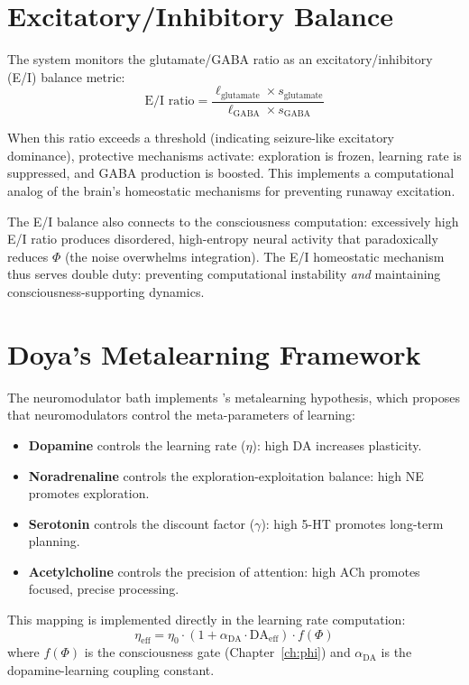 \documentclass[12pt]{book}
\begin{document}
\section{Excitatory/Inhibitory Balance}

The system monitors the glutamate/GABA ratio as an excitatory/inhibitory (E/I) balance metric:
\begin{equation}
\text{E/I ratio} = \frac{\ell_{\text{glutamate}} \times s_{\text{glutamate}}}{\ell_{\text{GABA}} \times s_{\text{GABA}}}
\end{equation}

When this ratio exceeds a threshold (indicating seizure-like excitatory dominance), protective mechanisms activate: exploration is frozen, learning rate is suppressed, and GABA production is boosted. This implements a computational analog of the brain's homeostatic mechanisms for preventing runaway excitation.

The E/I balance also connects to the consciousness computation: excessively high E/I ratio produces disordered, high-entropy neural activity that paradoxically reduces $\Phi$ (the noise overwhelms integration). The E/I homeostatic mechanism thus serves double duty: preventing computational instability \textit{and} maintaining consciousness-supporting dynamics.

\section{Doya's Metalearning Framework}

The neuromodulator bath implements \citet{doya2002metalearning}'s metalearning hypothesis, which proposes that neuromodulators control the meta-parameters of learning:

\begin{itemize}
  \item \textbf{Dopamine} controls the learning rate ($\eta$): high DA increases plasticity.
  \item \textbf{Noradrenaline} controls the exploration-exploitation balance: high NE promotes exploration.
  \item \textbf{Serotonin} controls the discount factor ($\gamma$): high 5-HT promotes long-term planning.
  \item \textbf{Acetylcholine} controls the precision of attention: high ACh promotes focused, precise processing.
\end{itemize}

This mapping is implemented directly in the learning rate computation:
\begin{equation}
\eta_{\text{eff}} = \eta_0 \cdot (1 + \alpha_{\text{DA}} \cdot \text{DA}_{\text{eff}}) \cdot f(\Phi)
\end{equation}
where $f(\Phi)$ is the consciousness gate (Chapter~\ref{ch:phi}) and $\alpha_{\text{DA}}$ is the dopamine-learning coupling constant.
\end{document}
